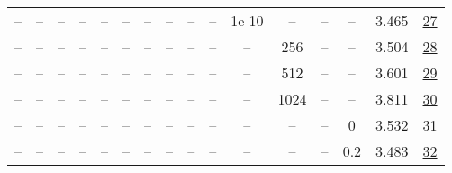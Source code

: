 \begin{table}[H]
\begin{tabular}{cccccccccccccccc}
-- & -- & -- & -- & -- & -- & -- & -- & -- & -- & 1e-10 & -- & -- & -- & 3.465 & \href{https://wandb.ai/stanford-mercury/optimizer-scaling/runs/sweep-130m-2B-muonfa5af4lr0.016-wd0.1-minlr0-warmup0-b10.8-b20.9-07fc5f}{27} \\
-- & -- & -- & -- & -- & -- & -- & -- & -- & -- & -- & 256 & -- & -- & 3.504 & \href{https://wandb.ai/stanford-mercury/optimizer-scaling/runs/sweep-130m-2B-muonbc742flr0.016-wd0.1-minlr0-warmup0-b10.8-b20.9-e61596}{28} \\
-- & -- & -- & -- & -- & -- & -- & -- & -- & -- & -- & 512 & -- & -- & 3.601 & \href{https://wandb.ai/stanford-mercury/optimizer-scaling/runs/sweep-130m-2B-muone42c7clr0.016-wd0.1-minlr0-warmup0-b10.8-b20.9-d56e40}{29} \\
-- & -- & -- & -- & -- & -- & -- & -- & -- & -- & -- & 1024 & -- & -- & 3.811 & \href{https://wandb.ai/stanford-mercury/optimizer-scaling/runs/sweep-130m-2B-muon556411lr0.016-wd0.1-minlr0-warmup0-b10.8-b20.9-bd403a}{30} \\
-- & -- & -- & -- & -- & -- & -- & -- & -- & -- & -- & -- & -- & 0 & 3.532 & \href{https://wandb.ai/stanford-mercury/optimizer-scaling/runs/sweep-130m-2B-muonb7380elr0.016-wd0-minlr0-warmup0-b10.8-b20.98--856a75}{31} \\
-- & -- & -- & -- & -- & -- & -- & -- & -- & -- & -- & -- & -- & 0.2 & 3.483 & \href{https://wandb.ai/stanford-mercury/optimizer-scaling/runs/sweep-130m-2B-muon8000c8lr0.016-wd0.2-minlr0-warmup0-b10.8-b20.9-60a749}{32} \\
\bottomrule
\end{tabular}
\end{table}

